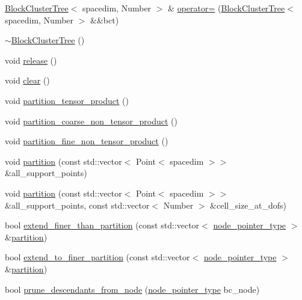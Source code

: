 \begin{DoxyCompactItemize}
\item 
\hyperlink{classBlockClusterTree}{Block\+Cluster\+Tree}$<$ spacedim, Number $>$ \& \hyperlink{classBlockClusterTree_aa635be81dfabed3ba455a17de3b65c2e}{operator=} (\hyperlink{classBlockClusterTree}{Block\+Cluster\+Tree}$<$ spacedim, Number $>$ \&\&bct)
\item 
\hyperlink{classBlockClusterTree_a43b969867200b06f3416647c3e4f9f61}{$\sim$\+Block\+Cluster\+Tree} ()
\item 
void \hyperlink{classBlockClusterTree_a0415fe94fd480bbb985a45dc691e2bed}{release} ()
\item 
void \hyperlink{classBlockClusterTree_ab4227d666cd2872fbbfb4eec69e66313}{clear} ()
\item 
void \hyperlink{classBlockClusterTree_ab10f54639969bc4aacd6aa27cf315610}{partition\+\_\+tensor\+\_\+product} ()
\item 
void \hyperlink{classBlockClusterTree_a0e40b3884535eae57d00c078ec782459}{partition\+\_\+coarse\+\_\+non\+\_\+tensor\+\_\+product} ()
\item 
void \hyperlink{classBlockClusterTree_ac6d23af20c52c7b32eb080bd54556206}{partition\+\_\+fine\+\_\+non\+\_\+tensor\+\_\+product} ()
\item 
void \hyperlink{classBlockClusterTree_a3ca42421f732c20fc07bdf5d5ab94319}{partition} (const std\+::vector$<$ Point$<$ spacedim $>$$>$ \&all\+\_\+support\+\_\+points)
\item 
void \hyperlink{classBlockClusterTree_a075983197c805c6451aa00502dc30e76}{partition} (const std\+::vector$<$ Point$<$ spacedim $>$$>$ \&all\+\_\+support\+\_\+points, const std\+::vector$<$ Number $>$ \&cell\+\_\+size\+\_\+at\+\_\+dofs)
\item 
bool \hyperlink{classBlockClusterTree_a3c4a4da89b964559cc02ecbf13ad4a4b}{extend\+\_\+finer\+\_\+than\+\_\+partition} (const std\+::vector$<$ \hyperlink{classTreeNode}{node\+\_\+pointer\+\_\+type} $>$ \&\hyperlink{classBlockClusterTree_a3ca42421f732c20fc07bdf5d5ab94319}{partition})
\item 
bool \hyperlink{classBlockClusterTree_adfe18d32a3c05a9209a5cdc9270b47d7}{extend\+\_\+to\+\_\+finer\+\_\+partition} (const std\+::vector$<$ \hyperlink{classTreeNode}{node\+\_\+pointer\+\_\+type} $>$ \&\hyperlink{classBlockClusterTree_a3ca42421f732c20fc07bdf5d5ab94319}{partition})
\item 
bool \hyperlink{classBlockClusterTree_a6fd771b68a4c7195151f6dc02e8ec7e9}{prune\+\_\+descendants\+\_\+from\+\_\+node} (\hyperlink{classTreeNode}{node\+\_\+pointer\+\_\+type} bc\+\_\+node)

\end{DoxyCompactItemize}
